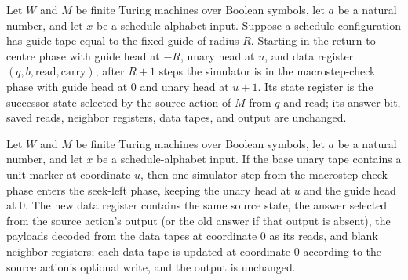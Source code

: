 \begin{lemma}
\label{Complexity.dataCfg_center_run}
\leanok
{}
Let $W$ and $M$ be finite Turing machines over Boolean symbols, let $a$ be a natural
number, and let $x$ be a schedule-alphabet input. Suppose a schedule configuration has
guide tape equal to the fixed guide of radius $R$. Starting in the return-to-centre
phase with guide head at $-R$, unary head at $u$, and data register
$(q,b,\mathrm{read},\mathrm{carry})$, after $R+1$ steps the simulator is in the
macrostep-check phase with guide head at $0$ and unary head at $u+1$. Its state register
is the successor state selected by the source action of $M$ from $q$ and
$\mathrm{read}$; its answer bit, saved reads, neighbor registers, data tapes, and output
are unchanged.
\end{lemma}

\begin{lemma}
\label{Complexity.dataCfg_check}
\leanok
{}
Let $W$ and $M$ be finite Turing machines over Boolean symbols, let $a$ be a natural
number, and let $x$ be a schedule-alphabet input. If the base unary tape contains a unit
marker at coordinate $u$, then one simulator step from the macrostep-check phase enters
the seek-left phase, keeping the unary head at $u$ and the guide head at $0$. The new
data register contains the same source state, the answer selected from the source
action's output (or the old answer if that output is absent), the payloads decoded from
the data tapes at coordinate $0$ as its reads, and blank neighbor registers; each data
tape is updated at coordinate $0$ according to the source action's optional write, and
the output is unchanged.
\end{lemma}

